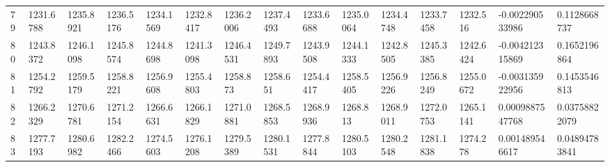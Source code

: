 \begin{landscape}
{\begin{longtable}{@{}lllllllllllllll@{}}
		79                                           & 1231.6788                & 1235.8921                & 1236.5176                & 1234.1569                & 1232.8417                & 1236.2006                & 1237.4493                & 1233.6688                & 1235.0064                & 1234.4748                & 1233.7458                & 1232.516                 & -0.002290533986                                                        & 0.1128668737                                    \\
		80                                           & 1243.8372                & 1246.1098                & 1245.8574                & 1244.8698                & 1241.3098                & 1246.4531                & 1249.7893                & 1243.9508                & 1244.1333                & 1242.8505                & 1245.3385                & 1242.6424                & -0.004212315869                                                        & 0.1652196864                                    \\
		81                                           & 1254.2792                & 1259.5179                & 1258.8221                & 1256.9608                & 1255.4803                & 1258.873                 & 1258.651                 & 1254.4417                & 1258.5405                & 1256.9226                & 1256.8249                & 1255.0672                & -0.003135922956                                                        & 0.1453546813                                    \\
		82                                           & 1266.2329                & 1270.6781                & 1271.2154                & 1266.6631                & 1266.1829                & 1271.0881                & 1268.5853                & 1268.9936                & 1268.813                 & 1268.9011                & 1272.0753                & 1265.1141                & 0.0009887547768                                                        & 0.03758822079                                   \\
		83                                           & 1277.7193                & 1280.6982                & 1282.2466                & 1274.5603                & 1276.1208                & 1279.5389                & 1280.1531                & 1277.8844                & 1280.5103                & 1280.2548                & 1281.1838                & 1274.278                 & 0.001489546617                                                         & 0.04894783841                                   \\

\end{longtable}}
\end{landscape}

